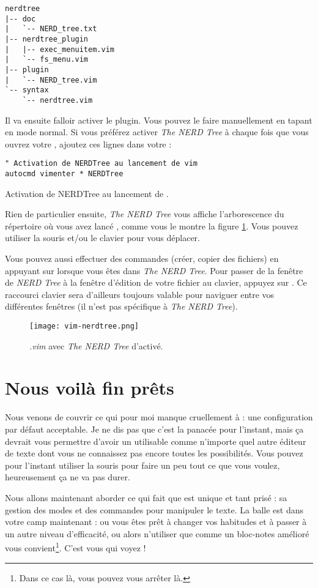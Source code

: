 \begin{verbatim}
nerdtree
|-- doc
|   `-- NERD_tree.txt
|-- nerdtree_plugin
|   |-- exec_menuitem.vim
|   `-- fs_menu.vim
|-- plugin
|   `-- NERD_tree.vim
`-- syntax
    `-- nerdtree.vim
\end{verbatim}

Il va ensuite falloir activer le plugin. Vous pouvez le faire manuellement en tapant  en mode normal. Si vous préférez activer \emph{The NERD Tree} à chaque fois que vous ouvrez votre \vim, ajoutez ces lignes dans votre \vimrc:

\begin{listing}[H]
\begin{verbatim}
" Activation de NERDTree au lancement de vim
autocmd vimenter * NERDTree
\end{verbatim}
\caption{Activation de NERDTree au lancement de \vim.}
\label{code:nerdtreee}
\end{listing}

Rien de particulier ensuite, \emph{The NERD Tree} vous affiche l'arborescence du répertoire où vous avez lancé \vim, comme vous le montre la figure \ref{fig:vim-nerdtree}. Vous pouvez utiliser la souris et/ou le clavier pour vous déplacer. 

Vous pouvez aussi effectuer des commandes (créer, copier des fichiers) en appuyant sur \ttm lorsque vous êtes dans \emph{The NERD Tree}. Pour passer de la fenêtre de \emph{NERD Tree} à la fenêtre d'édition de votre fichier au clavier, appuyez sur . Ce raccourci clavier sera d'ailleurs toujours valable pour naviguer entre vos différentes fenêtres \vim (il n'est pas spécifique à \emph{The NERD Tree}).

\begin{figure}%
  \texttt{[image: vim-nerdtree.png]}
  \caption{\emph{.vim} avec \emph{The NERD Tree} d'activé.}
  \label{fig:vim-nerdtree}
\end{figure}

\section{Nous voilà fin prêts}

Nous venons de couvrir ce qui pour moi manque cruellement à \vim : une configuration par défaut acceptable. Je ne dis pas que c'est la panacée pour l'instant, mais ça devrait vous permettre d'avoir un \vim utilisable comme n'importe quel autre éditeur de texte dont vous ne connaissez pas encore toutes les possibilités. Vous pouvez pour l'instant utiliser la souris pour faire un peu tout ce que vous voulez, heureusement ça ne va pas durer.

Nous allons maintenant aborder ce qui fait que \vim est unique et tant prisé : sa gestion des modes et des commandes pour manipuler le texte. La balle est dans votre camp maintenant : ou vous êtes prêt à changer vos habitudes et à passer à un autre niveau d'efficacité, ou alors n'utiliser \vim que comme un bloc-notes amélioré vous convient\footnote{Dans ce cas là, vous pouvez vous arrêter là.}. C'est vous qui voyez !
